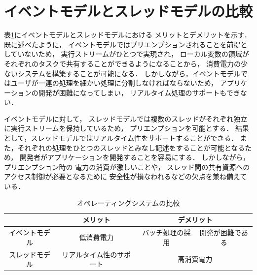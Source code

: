 \section{イベントモデルとスレッドモデルの比較}\label{sec:comparison_between_event_and_threads}
表\ref{tab:merit_and_demerit}にイベントモデルとスレッドモデルにおける
メリットとデメリットを示す．
既に述べたように，
イベントモデルではプリエンプションされることを前提としていないため，
実行ストリームがひとつで実現され，
ローカル変数の領域がそれぞれのタスクで共有することができるようになることから，
消費電力の少ないシステムを構築することが可能になる．
しかしながら，イベントモデルではユーザが一連の処理を細かい処理に分割しなければならないため，
アプリケーションの開発が困難になってしまい，
リアルタイム処理のサポートもできない．


イベントモデルに対して，
スレッドモデルでは複数のスレッドがそれぞれ独立に実行ストリームを保持しているため，
プリエンプションを可能とする．
結果として，スレッドモデルではリアルタイム性をサポートすることができる．
また，それぞれの処理をひとつのスレッドとみなし記述をすることが可能となるため，
開発者がアプリケーションを開発することを容易にする．
しかしながら，プリエンプション時の
電力の消費が激しいことや，
スレッド間の共有資源へのアクセス制御が必要となるために
安全性が損なわれるなどの欠点を兼ね備えている．


%



\begin{table}[htb]
  \centering
  \caption{オペレーティングシステムの比較}
  \begin{tabular}{|c||c|c|c|c|} \hline
    \backslashbox{}{} & \multicolumn{2}{|c|}{メリット} & \multicolumn{2}{|c|}{デメリット} \\ \hline \hline
    イベントモデル & \multicolumn{2}{|c|}{低消費電力} & バッチ処理の採用 & 開発が困難である \\ \hline
    スレッドモデル & \multicolumn{2}{|c|}{リアルタイム性のサポート} & \multicolumn{2}{|c|}{高消費電力} \\ \hline
  \end{tabular}
  \label{tab:merit_and_demerit}
\end{table}





